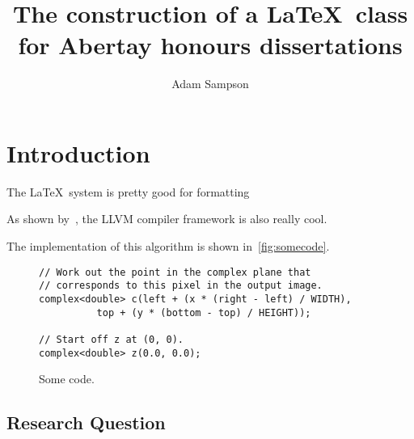 \documentclass{abertayhons}
\begin{document}
\frontmatter

\title{The construction of a \LaTeX\ class for Abertay honours
dissertations}
\author{Adam Sampson}
\maketitle

\tablematter

\tableofcontents

\listoffigures

\listoftables

\frontmatter

\begin{acknowledgements}
\Blindtext[1]
\end{acknowledgements}

\begin{abstract}
\Blindtext[2]
\end{abstract}

\mainmatter

\chapter{Introduction}

The \LaTeX\ system is pretty good for formatting
\blindtext

As shown by~\cite{llvm}, the LLVM compiler framework is also really cool.
\blindtext

\blindtext
The implementation of this algorithm is shown in~\autoref{fig:somecode}.

\begin{figure}
\begin{verbatim}
// Work out the point in the complex plane that
// corresponds to this pixel in the output image.
complex<double> c(left + (x * (right - left) / WIDTH),
		  top + (y * (bottom - top) / HEIGHT));

// Start off z at (0, 0).
complex<double> z(0.0, 0.0);
\end{verbatim}
\caption{Some code.}
\label{fig:somecode}
\end{figure}

\Blindtext

\section{Research Question}
\end{document}
